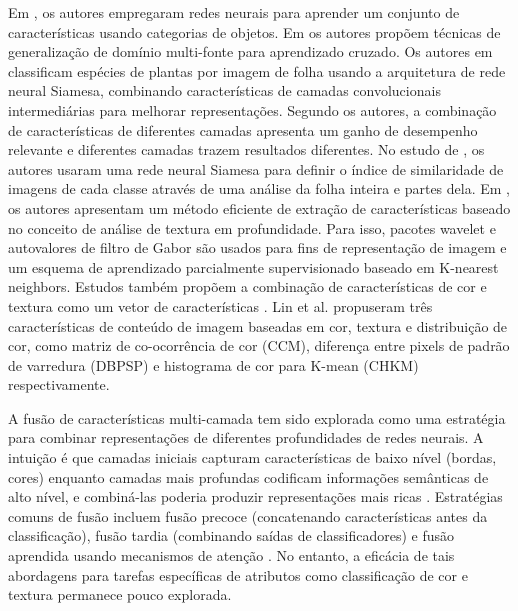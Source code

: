 \documentclass[conference]{IEEEtran}
\begin{document}
Em \cite{b10}, os autores empregaram redes neurais para aprender um conjunto de caracter\'{i}sticas usando categorias de objetos. Em \cite{b11} os autores prop\~{o}em t\'{e}cnicas de generaliza\c{c}\~{a}o de dom\'{i}nio multi-fonte para aprendizado cruzado. Os autores em \cite{b8} classificam esp\'{e}cies de plantas por imagem de folha usando a arquitetura de rede neural Siamesa, combinando caracter\'{i}sticas de camadas convolucionais intermedi\'{a}rias para melhorar representa\c{c}\~{o}es. Segundo os autores, a combina\c{c}\~{a}o de caracter\'{i}sticas de diferentes camadas apresenta um ganho de desempenho relevante e diferentes camadas trazem resultados diferentes. No estudo de \cite{b9}, os autores usaram uma rede neural Siamesa para definir o \'{i}ndice de similaridade de imagens de cada classe atrav\'{e}s de uma an\'{a}lise da folha inteira e partes dela. Em \cite{b13}, os autores apresentam um m\'{e}todo eficiente de extra\c{c}\~{a}o de caracter\'{i}sticas baseado no conceito de an\'{a}lise de textura em profundidade. Para isso, pacotes wavelet e autovalores de filtro de Gabor s\~{a}o usados para fins de representa\c{c}\~{a}o de imagem e um esquema de aprendizado parcialmente supervisionado baseado em K-nearest neighbors. Estudos tamb\'{e}m prop\~{o}em a combina\c{c}\~{a}o de caracter\'{i}sticas de cor e textura como um vetor de caracter\'{i}sticas \cite{b14}. Lin et al. \cite{b15} propuseram tr\^{e}s caracter\'{i}sticas de conte\'{u}do de imagem baseadas em cor, textura e distribui\c{c}\~{a}o de cor, como matriz de co-ocorr\^{e}ncia de cor (CCM), diferen\c{c}a entre pixels de padr\~{a}o de varredura (DBPSP) e histograma de cor para K-mean (CHKM) respectivamente.

A fus\~{a}o de caracter\'{i}sticas multi-camada tem sido explorada como uma estrat\'{e}gia para combinar representa\c{c}\~{o}es de diferentes profundidades de redes neurais. A intui\c{c}\~{a}o \'{e} que camadas iniciais capturam caracter\'{i}sticas de baixo n\'{i}vel (bordas, cores) enquanto camadas mais profundas codificam informa\c{c}\~{o}es sem\^{a}nticas de alto n\'{i}vel, e combin\'{a}-las poderia produzir representa\c{c}\~{o}es mais ricas \cite{b26}. Estrat\'{e}gias comuns de fus\~{a}o incluem fus\~{a}o precoce (concatenando caracter\'{i}sticas antes da classifica\c{c}\~{a}o), fus\~{a}o tardia (combinando sa\'{i}das de classificadores) e fus\~{a}o aprendida usando mecanismos de aten\c{c}\~{a}o \cite{b27}. No entanto, a efic\'{a}cia de tais abordagens para tarefas espec\'{i}ficas de atributos como classifica\c{c}\~{a}o de cor e textura permanece pouco explorada.
\end{document}
